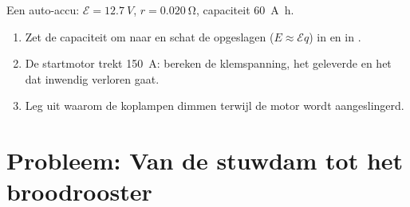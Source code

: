 \begin{exercise}[$\star\star\star$]\label{exo:g11:circuits-and-power:15}
Een auto-accu: $\mathcal{E} = \qty{12.7}{V}$, $r = \qty{0.020}{\ohm}$,
capaciteit \qty{60}{A.h}.
\begin{enumerate}
  \item Zet de capaciteit om naar  en schat de opgeslagen 
        ($E \approx \mathcal{E} q$) in  en in .
  \item De startmotor trekt \qty{150}{A}: bereken de klemspanning, het
        geleverde  en het  dat inwendig verloren gaat.
  \item Leg uit waarom de koplampen dimmen terwijl de motor wordt
        aangeslingerd.
\end{enumerate}
\end{exercise}

\section{Probleem: Van de stuwdam tot het broodrooster}

